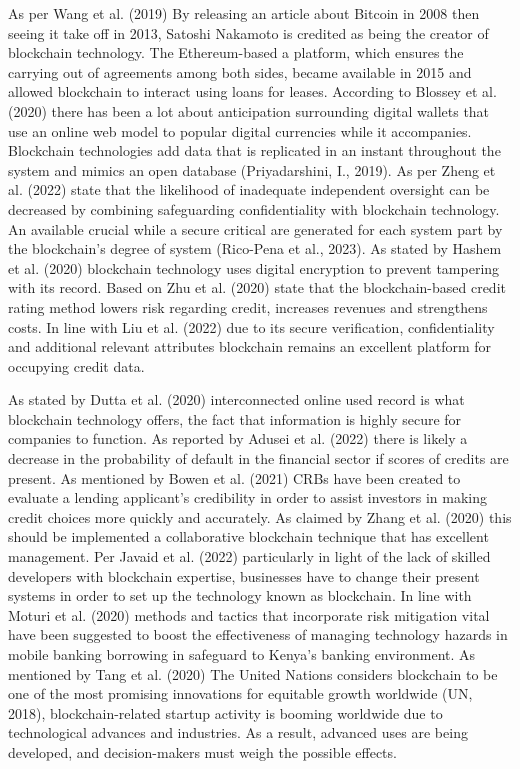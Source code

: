 \documentclass[a4paper]{article}
\begin{document}
As per Wang et al. (2019) By releasing an article about Bitcoin in 2008 then seeing it take off in 2013, Satoshi Nakamoto is credited as being the creator of blockchain technology. The Ethereum-based a platform, which ensures the carrying out of agreements among both sides, became available in 2015 and allowed blockchain to interact using loans for leases. According to Blossey et al. (2020) there has been a lot about anticipation surrounding digital wallets that use an online web model to popular digital currencies while it accompanies. Blockchain technologies add data that is replicated in an instant throughout the system and mimics an open database (Priyadarshini, I., 2019). As per Zheng et al. (2022) state that the likelihood of inadequate independent oversight can be decreased by combining safeguarding confidentiality with blockchain technology. An available crucial while a secure critical are generated for each system part by the blockchain's degree of system (Rico-Pena et al., 2023). As stated by Hashem et al. (2020) blockchain technology uses digital encryption to prevent tampering with its record. Based on Zhu et al. (2020) state that the blockchain-based credit rating method lowers risk regarding credit, increases revenues and strengthens costs. In line with Liu et al. (2022) due to its secure verification, confidentiality and additional relevant attributes blockchain remains an excellent platform for occupying credit data.

As stated by Dutta et al. (2020) interconnected online used record is what blockchain technology offers, the fact that information is highly secure for companies to function. As reported by Adusei et al. (2022) there is likely a decrease in the probability of default in the financial sector if scores of credits are present. As mentioned by Bowen et al. (2021) CRBs have been created to evaluate a lending applicant's credibility in order to assist investors in making credit choices more quickly and accurately. As claimed by Zhang et al. (2020) this should be implemented a collaborative blockchain technique that has excellent management. Per Javaid et al. (2022) particularly in light of the lack of skilled developers with blockchain expertise, businesses have to change their present systems in order to set up the technology known as blockchain. In line with Moturi et al. (2020) methods and tactics that incorporate risk mitigation vital have been suggested to boost the effectiveness of managing technology hazards in mobile banking borrowing in safeguard to Kenya's banking environment. As mentioned by Tang et al. (2020) The United Nations considers blockchain to be one of the most promising innovations for equitable growth worldwide (UN, 2018), blockchain-related startup activity is booming worldwide due to technological advances and industries. As a result, advanced uses are being developed, and decision-makers must weigh the possible effects.
\end{document}
